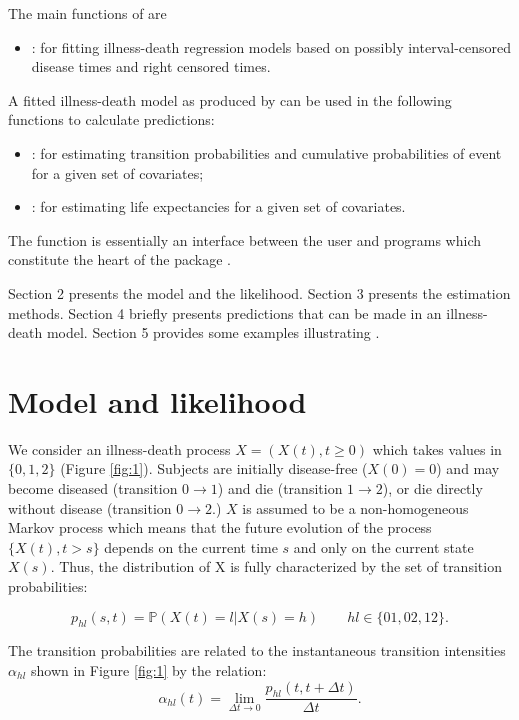 \documentclass[article]{jss}
\begin{document}
The main functions of  are
\begin{itemize}
\item {} : for fitting illness-death regression models based on possibly interval-censored disease times and right censored times.
\end{itemize}
 A fitted illness-death model as produced
by  can be used in the following functions to calculate predictions: 
\begin{itemize}
\item {} : for estimating transition probabilities and cumulative probabilities of event for a given set of covariates;
\item {} : for estimating life expectancies for a given set of covariates.
\end{itemize}

The  function  is essentially an interface between 
the user
and  programs which constitute the heart of the
package .

Section 2 presents the model and the likelihood.
Section 3 presents the estimation methods.
Section 4 briefly presents predictions that can be made in an illness-death model. 
Section 5 provides some examples illustrating .
\section{Model and likelihood}
\label{sec-2}

We consider an illness-death process \(X=(X(t),t \geq 0)\) which takes
values in \(\{0,1,2\}\) (Figure \ref{fig:1}). Subjects are initially
disease-free (\(X(0)=0\)) and may become diseased (transition \(0
\rightarrow 1\)) and die (transition \(1 \rightarrow 2\)), or die
directly without disease (transition \(0 \rightarrow 2\).)  \(X\) is
assumed to be a non-homogeneous Markov process which means that the
future evolution of the process \(\{X(t),t>s\}\) depends on the current
time \(s\) and only on the current state \(X(s)\). Thus, the distribution
of X is fully characterized by the set of transition probabilities:

\begin{equation*}
p_{hl}(s,t)=\mathbb{P}(X(t)=l|X(s)=h)\qquad hl \in \{01,02,12\}.
\end{equation*}

The transition probabilities are related to the instantaneous
transition intensities \(\alpha_{hl}\) shown in Figure \ref{fig:1} by
the relation: 
\begin{equation*}
\alpha_{hl}(t)=\lim_{\Delta t \to
0}\frac{p_{hl}(t,t+\Delta t)}{\Delta t}.
\end{equation*}
\end{document}
